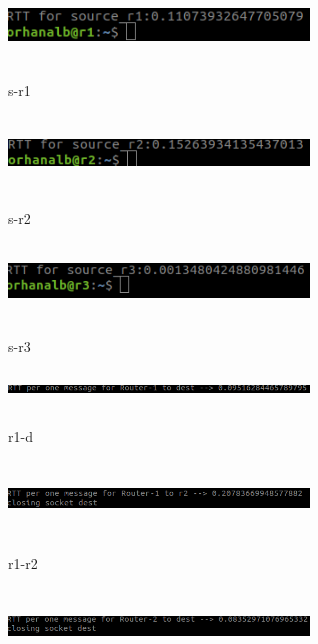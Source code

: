 \documentclass[letterpaper, 12 pt, conference]{ieeeconf}  %
\begin{document}
\includegraphics[width=8cm, height=2cm]{s-r1.png}

\begin{center}
s-r1
\end{center}



\includegraphics[width=8cm, height=2cm]{s-r2.png}

\begin{center}
s-r2
\end{center}



\includegraphics[width=8cm, height=2cm]{s-r3.png}

\begin{center}
s-r3
\end{center}



\includegraphics[width=8cm, height=1cm]{r1-d.png}

\begin{center}
r1-d
\end{center}



\includegraphics[width=8cm, height=2cm]{r1-r2.png}

\begin{center}
r1-r2
\end{center}


\includegraphics[width=8cm, height=2cm]{r2-d.png}
\end{document}
